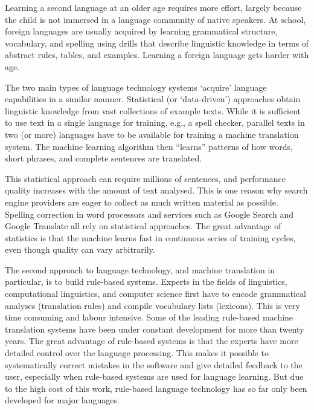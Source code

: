 \begin{multicols}{2}
Learning a second language at an older age requires more effort, largely because the child is not immersed in a language community of native speakers.
At school, foreign languages are usually acquired by learning grammatical structure, vocabulary, and spelling using drills that describe linguistic knowledge in terms of abstract rules, tables, and examples.
Learning a foreign language gets harder with age.

The two main types of language technology systems `acquire' language capabilities in a similar manner.
Statistical (or `data-driven') approaches obtain linguistic knowledge from vast collections of example texts.
While it is sufficient to use text in a single language for training, e.g., a spell checker, parallel texts in two (or more) languages have to be available for training a machine translation system.
The machine learning algorithm then ``learns'' patterns of how words, short phrases, and complete sentences are translated. 


This statistical approach can require millions of sentences, and performance quality increases with the amount of text analysed.
This is one reason why search engine providers are eager to collect as much written material as possible.
Spelling correction in word processors and services such as Google Search and Google Translate all rely on statistical approaches.
The great advantage of statistics is that the machine learns fast in continuous series of training cycles, even though quality can vary arbitrarily.

The second approach to language technology, and machine translation in particular, is to build rule-based systems.
Experts in the fields of linguistics, computational linguistics, and computer science first have to encode grammatical analyses (translation rules) and compile vocabulary lists (lexicons).
This is very time consuming and labour intensive.
Some of the leading rule-based machine translation systems have been under constant development for more than twenty years.
The great advantage of rule-based systems is that the experts have more detailed control over the language processing.
This makes it possible to systematically correct mistakes in the software and give detailed feedback to the user, especially when rule-based systems are used for language learning.
But due to the high cost of this work, rule-based language technology has so far only been developed for major languages. 


\end{multicols}
